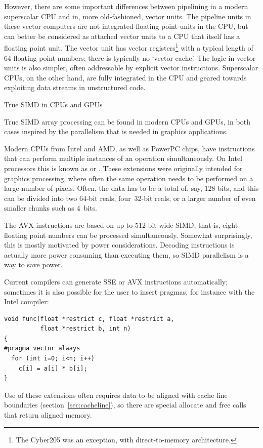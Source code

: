 However, there are some important differences between pipelining in a
modern superscalar CPU and in, more old-fashioned, vector units.  The
pipeline units in these vector computers are not integrated floating
point units in the CPU, but can better be considered as attached
vector units to a CPU that itself has a floating point unit. The
vector unit has vector registers\footnote{The Cyber205 was an
  exception, with direct-to-memory architecture.} with a typical
length of 64 floating point numbers; there is typically no `vector
cache'. The logic in vector units is also simpler, often addressable
by explicit vector instructions. Superscalar CPUs, on the other hand,
are fully integrated in the CPU and geared towards exploiting data
streams in unstructured code.

 {True SIMD in CPUs and GPUs}
\label{sec:sse-avx}

True SIMD array processing can be found in modern CPUs and GPUs, in
both cases inspired by the parallelism that is needed in graphics
applications.

Modern CPUs from Intel and AMD, as well as
PowerPC chips, have instructions that can perform
multiple instances of an operation simultaneously. On Intel processors
this is known as  or . These extensions were
originally intended for graphics processing, where often the same
operation needs to be performed on a large number of pixels. Often,
the data has to be a total of, say, 128 bits, and this can be divided
into two 64-bit reals, four~32-bit reals, or a larger number of even
smaller chunks such as 4~bits. 

The \ac{AVX} instructions are based on up to
512-bit wide SIMD, that is, eight floating point numbers can be
processed simultaneously. Somewhat surprisingly, this is mostly
motivated by power considerations. Decoding instructions is actually
more power consuming than executing them, so SIMD parallelism is a way
to save power.

Current compilers can generate \ac{SSE} or \ac{AVX}
instructions automatically;
sometimes it is also possible for the user to insert pragmas, for
instance with the Intel compiler:
\begin{verbatim}
void func(float *restrict c, float *restrict a,
          float *restrict b, int n)
{
#pragma vector always
  for (int i=0; i<n; i++)
    c[i] = a[i] * b[i];
}
\end{verbatim}
Use of these extensions often requires data to be aligned with cache
line boundaries (section~\ref{sec:cacheline}), so there are special
allocate and free calls that return aligned memory.

